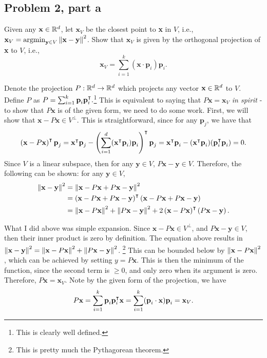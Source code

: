 \subsection{Problem 2, part a}
Given any $\textbf{x} \in \mathbb{R}^d$, let $\textbf{x}_V$ be the closest point to \textbf{x} in $V$, i.e., $\textbf{x}_V = \operatorname*{argmin}_{\textbf{y} \in V}\norm{\textbf{x} - \textbf{y}}^2$. Show that $\textbf{x}_V$ is given by the orthogonal projection of \textbf{x} to $V$, i.e.,
\[\textbf{x}_V = \sum_{i = 1}^k (\textbf{x}\cdot \textbf{p}_i) \textbf{p}_i.\]
\partbreak
\begin{solution}

    Denote the projection $P : \mathbb{R}^d \to \mathbb{R}^d$ which projects any vector $\textbf{x}\in \mathbb{R}^d$ to $V$. Define $P$ as $P = \sum_{i = 1}^k \textbf{p}_i \textbf{p}_i^{\intercal}.$\footnote{This is clearly well defined.} This is equivalent to saying that $P\textbf{x} = \textbf{x}_V$ \textit{in spirit} - to show that $P\textbf{x}$ is of the given form, we need to do some work. First, we will show that $\textbf{x} - P\textbf{x} \in V^\perp$. This is straightforward, since for any $\textbf{p}_j$, we have that 
    \[\left(\textbf{x} - P\textbf{x}\right)^{\intercal} \textbf{p}_j = \textbf{x}^{\intercal} \textbf{p}_j - \left( \sum_{i = 1}^d (\textbf{x}^{\intercal} \textbf{p}_i) \textbf{p}_i\right)^{\intercal} \textbf{p}_j = \textbf{x}^{\intercal} \textbf{p}_i - (\textbf{x}^{\intercal}\textbf{p}_i)(\textbf{p}_i^{\intercal}\textbf{p}_i) = 0.\]
    Since $V$ is a linear subspace, then for any $\textbf{y} \in V$, $P\textbf{x} - \textbf{y} \in V$. Therefore, the following can be shown: for any $\textbf{y} \in V$,
    \begin{align*}
        \norm{\textbf{x} - \textbf{y}}^2 &= \norm{\textbf{x} - P\textbf{x} + P\textbf{x} - \textbf{y}}^2\\
        &=\left( \textbf{x} - P\textbf{x} + P\textbf{x} - \textbf{y}\right)^{\intercal}\left(\textbf{x} - P\textbf{x} + P\textbf{x} - \textbf{y}\right)\\
        &= \norm{\textbf{x} - P\textbf{x}}^2 + \norm{P\textbf{x} - \textbf{y}}^2 + 2\left(\textbf{x} - P\textbf{x}\right)^{\intercal}\left(P\textbf{x} - \textbf{y}\right). 
    \end{align*}

    What I did above was simple expansion. Since $\textbf{x} - P\textbf{x} \in V^\perp$, and $P\textbf{x} - \textbf{y} \in V$, then their inner product is zero by definition. The equation above results in $\norm{\textbf{x} - \textbf{y}}^2 = \norm{\textbf{x} - P\textbf{x}}^2 + \norm{P\textbf{x} - \textbf{y}}^2$. \footnote{This is pretty much the Pythagorean theorem.} This can be bounded below by $\norm{\textbf{x} - P\textbf{x}}^2$, which can be achieved by setting $y = P\textbf{x}$. This is then the minimum of the function, since the second term is $\geq 0$, and only zero when its argument is zero. Therefore, $P\textbf{x} = \textbf{x}_V$. Note by the given form of the projection, we have 
    \[P\textbf{x} = \sum_{i = 1}^k \textbf{p}_i\textbf{p}_i^{\intercal} \textbf{x} = \sum_{i = 1}^k (\textbf{p}_i \cdot \textbf{x})\textbf{p}_i = \textbf{x}_V.\]
    
\end{solution}

